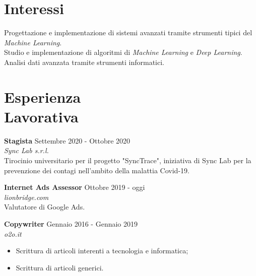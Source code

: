 \documentclass[margin, 10pt]{res}
\begin{document}
\begin{resume}

\section{Interessi}
Progettazione e implementazione di sistemi avanzati tramite strumenti tipici del \textit{Machine Learning}. \\
Studio e implementazione di algoritmi di \textit{Machine Learning} e \textit{Deep Learning}. \\
Analisi dati avanzata tramite strumenti informatici.



 
\section{Esperienza \\ Lavorativa}

\textbf{Stagista} \hfill Settembre 2020 - Ottobre 2020 \\
\textit{Sync Lab s.r.l.} \\
Tirocinio universitario per il progetto "SyncTrace", iniziativa di Sync Lab per la prevenzione dei contagi nell'ambito della malattia Covid-19.


\textbf{Internet Ads Assessor} \hfill Ottobre 2019 - oggi \\
\textit{lionbridge.com} \\
Valutatore di Google Ads.

\textbf{Copywriter} \hfill Gennaio 2016 - Gennaio 2019 \\
\textit{o2o.it}
\begin{itemize}
\item Scrittura di articoli interenti a tecnologia e informatica;
\item Scrittura di articoli generici.
\end{itemize} 




\end{resume}
\end{document}
